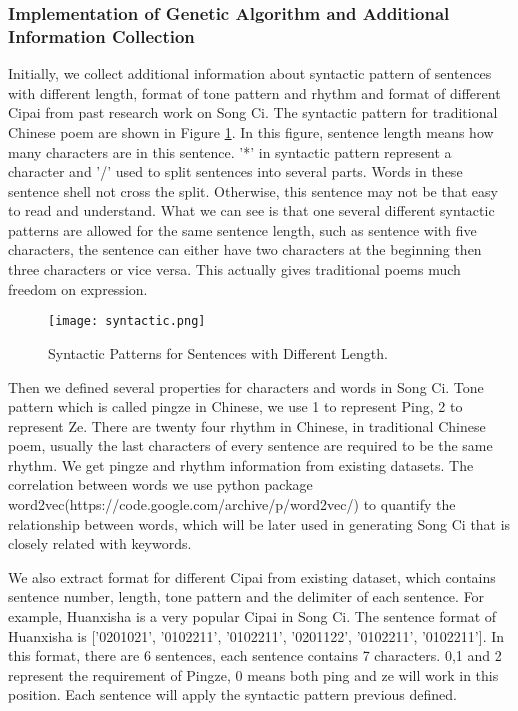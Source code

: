 \subsubsection{Implementation of Genetic Algorithm and Additional Information Collection}
Initially, we collect additional information about syntactic pattern of sentences with different length, format of tone pattern and rhythm and format of different Cipai from past research work on Song Ci.
%
The syntactic pattern for traditional Chinese poem are shown in Figure \ref{fig:syntactic}.
%
In this figure, sentence length means how many characters are in this sentence.
%
'*' in syntactic pattern represent a character and '/' used to split sentences into several parts.
%
Words in these sentence shell not cross the split.
%
Otherwise, this sentence may not be that easy to read and understand.
%
What we can see is that one several different syntactic patterns are allowed for the same sentence length, such as sentence with five characters, the sentence can either have two characters at the beginning then three characters or vice versa.
%
This actually gives traditional poems much freedom on expression.

\begin{figure}[htbp]
	\centering
	\texttt{[image: syntactic.png]}
	\caption{Syntactic Patterns for Sentences with Different Length.}
	\label{fig:syntactic}
\end{figure}

Then we defined several properties for characters and words in Song Ci.
%
Tone pattern which is called pingze in Chinese, we use 1 to represent Ping, 2 to represent Ze.
%
There are twenty four rhythm in Chinese, in traditional Chinese poem, usually the last characters of every sentence are required to be the same rhythm.
%
 We get pingze and rhythm information from existing datasets.
%
The correlation between words we use python package word2vec(https://code.google.com/archive/p/word2vec/) to quantify the relationship between words, which will be later used in generating Song Ci that is closely related with keywords.


We also extract format for different Cipai from existing dataset, which contains sentence number, length, tone pattern and the delimiter of each sentence.
%
For example, Huanxisha is a very popular Cipai in Song Ci.
%
The sentence format of Huanxisha is ['0201021', '0102211', '0102211', '0201122', '0102211', '0102211'].
%
In this format, there are 6 sentences, each sentence contains 7 characters.
%
0,1 and 2 represent the requirement of Pingze, 0 means both ping and ze will work in this position.
%
Each sentence will apply the syntactic pattern previous defined.


